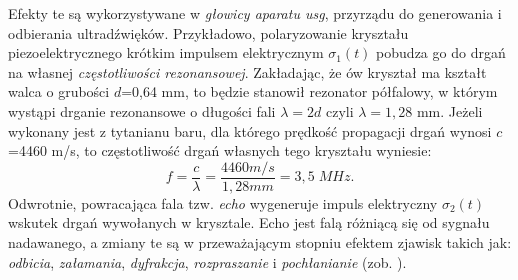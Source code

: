 Efekty te są wykorzystywane w \textit{głowicy aparatu usg}, przyrządu do generowania \linebreak i odbierania ultradźwięków. Przykładowo, polaryzowanie kryształu piezoelektrycznego krótkim impulsem elektrycznym $\sigma_1(t)$ pobudza go do drgań na własnej \textit{częstotliwości rezonansowej}. Zakładając, że ów kryształ ma kształt walca o grubości $d$=0,64 mm, to będzie stanowił rezonator półfalowy, w którym wystąpi drganie rezonansowe o długości fali $\lambda = 2d$ czyli $\lambda = 1,28$ mm. Jeżeli wykonany jest z tytanianu baru, dla którego prędkość propagacji drgań wynosi $c$=4460 m/s, to częstotliwość drgań własnych tego kryształu wyniesie:
\begin{equation}
f = \frac{c}{\lambda} = \frac{4460 m/s}{1,28 mm} = 3,5 \; MHz.
\end{equation}
Odwrotnie, powracająca fala tzw. \textit{echo} wygeneruje impuls elektryczny $\sigma_2(t)$ wskutek drgań wywołanych w krysztale. Echo jest falą różniącą się od sygnału nadawanego, a zmiany te są w przeważającym stopniu efektem zjawisk takich jak: \textit{odbicia}, \textit{załamania}, \textit{dyfrakcja}, \textit{rozpraszanie} i \textit{pochłanianie} (zob. \cite{makarewicz1978}).

